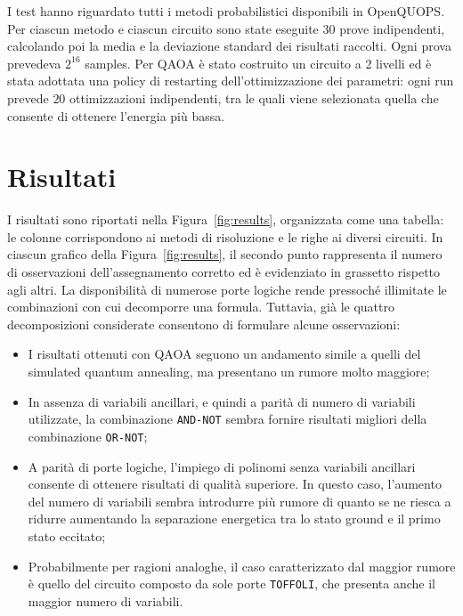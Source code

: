 \documentclass[]{article}
\begin{document}
I test hanno riguardato tutti i metodi probabilistici disponibili in OpenQUOPS. Per ciascun metodo e ciascun circuito sono state eseguite 30 prove indipendenti, calcolando poi la media e la deviazione standard dei risultati raccolti. Ogni prova prevedeva $2^{16}$ samples. Per QAOA è stato costruito un circuito a 2 livelli ed è stata adottata una policy di restarting dell'ottimizzazione dei parametri: ogni run prevede $20$ ottimizzazioni indipendenti, tra le quali viene selezionata quella che consente di ottenere l'energia più bassa.

\section{Risultati}\label{sec:results}
I risultati sono riportati nella Figura~\ref{fig:results}, organizzata come una tabella: le colonne corrispondono ai metodi di risoluzione e le righe ai diversi circuiti. In ciascun grafico della Figura~\ref{fig:results}, il secondo punto rappresenta il numero di osservazioni dell'assegnamento corretto ed è evidenziato in grassetto rispetto agli altri.
La disponibilità di numerose porte logiche rende pressoché illimitate le combinazioni con cui decomporre una formula. Tuttavia, già le quattro decomposizioni considerate consentono di formulare alcune osservazioni:
\begin{itemize}
	\item I risultati ottenuti con QAOA seguono un andamento simile a quelli del simulated quantum annealing, ma presentano un rumore molto maggiore;
	\item In assenza di variabili ancillari, e quindi a parità di numero di variabili utilizzate, la combinazione \texttt{AND-NOT} sembra fornire risultati migliori della combinazione \texttt{OR-NOT};
	\item A parità di porte logiche, l'impiego di polinomi senza variabili ancillari consente di ottenere risultati di qualità superiore. In questo caso, l'aumento del numero di variabili sembra introdurre più rumore di quanto se ne riesca a ridurre aumentando la separazione energetica tra lo stato ground e il primo stato eccitato;
	\item Probabilmente per ragioni analoghe, il caso caratterizzato dal maggior rumore è quello del circuito composto da sole porte \texttt{TOFFOLI}, che presenta anche il maggior numero di variabili.
\end{itemize}
\end{document}
